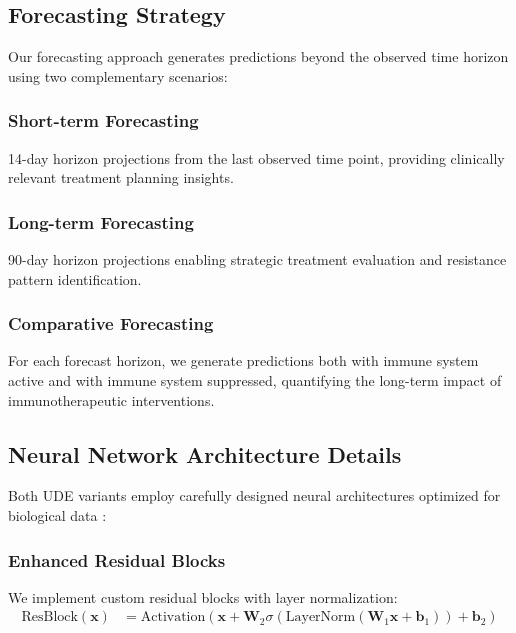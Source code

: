 \documentclass{juliacon}
\begin{document}
\subsection{Forecasting Strategy}

Our forecasting approach generates predictions beyond the observed time horizon using two complementary scenarios:

\subsubsection{Short-term Forecasting}
14-day horizon projections from the last observed time point, providing clinically relevant treatment planning insights.

\subsubsection{Long-term Forecasting}
90-day horizon projections enabling strategic treatment evaluation and resistance pattern identification.

\subsubsection{Comparative Forecasting}
For each forecast horizon, we generate predictions both with immune system active and with immune system suppressed, quantifying the long-term impact of immunotherapeutic interventions.

\subsection{Neural Network Architecture Details}

Both UDE variants employ carefully designed neural architectures optimized for biological data \cite{teshima2020universal}:

\subsubsection{Enhanced Residual Blocks}
We implement custom residual blocks with layer normalization:
\begin{align}
\text{ResBlock}(\mathbf{x}) &= \text{Activation}(\mathbf{x} + \mathbf{W}_2 \sigma(\text{LayerNorm}(\mathbf{W}_1 \mathbf{x} + \mathbf{b}_1)) + \mathbf{b}_2)
\end{align}
\end{document}

